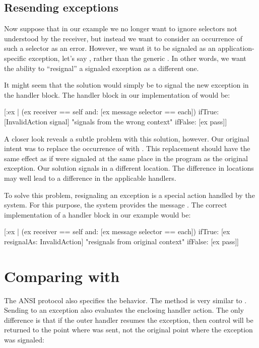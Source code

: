 \documentclass[a4paper,10pt,twoside]{book}
\begin{document}
\subsection{Resending exceptions}

Now suppose that in our  example we no longer want to ignore selectors not understood by the receiver, but instead we want to consider an occurrence of such a selector as an error. However, we want it to be signaled as an application-specific exception, let's say , rather than the generic . In other words, we want the ability to ``resignal'' a signaled exception as a different one.

It might seem that the solution would simply be to signal the new exception in the handler block. The handler block in our implementation of  would be:

\begin{code}{}
[:ex | (ex receiver == self and: [ex message selector == each])
	ifTrue: [InvalidAction signal]    "signals from the wrong context"
	ifFalse: [ex pass]]
\end{code}

A closer look reveals a subtle problem with this solution, however. Our original intent was to replace the occurrence of  with . This replacement should have the same effect as if  were signaled at the same place in the program as the original  exception. Our solution signals  in a different location. The difference in locations may well lead to a difference in the applicable handlers.

To solve this problem, resignaling an exception is a special action handled by the system. For this purpose, the system provides the message . The correct implementation of a handler block in our  example would be:

\begin{code}{}
 [:ex |  (ex receiver == self and: [ex message selector == each])
	ifTrue: [ex resignalAs: InvalidAction]    "resignals from original context"
	ifFalse: [ex pass]]
\end{code}

\section{Comparing  with }
The ANSI protocol also specifies the  behavior. The method  is very similar to . Sending  to an exception also evaluates the enclosing handler action. The only difference is that if the outer handler resumes the exception, then control will be returned to the point where  was sent, not the original point where the exception was signaled:
\end{document}
